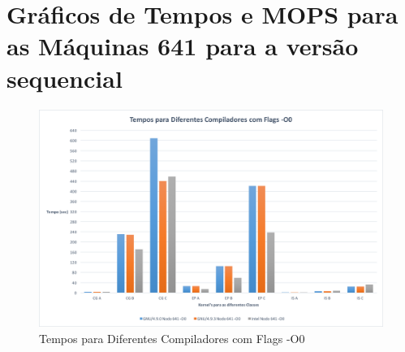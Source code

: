 \documentclass[conference,compsoc]{IEEEtran}
\begin{document}






%
%
%




\appendix

\section{Gráficos de Tempos e MOPS para as Máquinas 641 para a versão sequencial}
\label{appendix:641_seq}

\begin{figure}[h!]
\centering
\includegraphics[scale=0.325]{SER/tempos_dif_comp_O0_nodo_641.png}
\caption{Tempos para Diferentes Compiladores com Flags -O0}
\end{figure}
\end{document}
